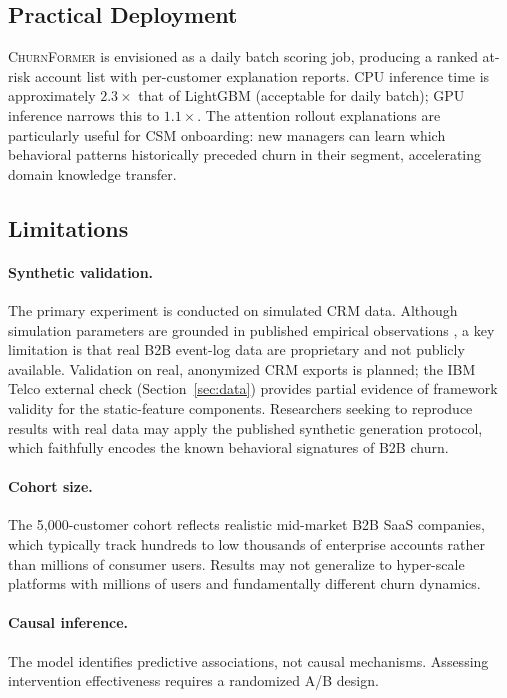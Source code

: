 \documentclass[review, 12pt]{elsarticle}
\newcommand{\model}{\textsc{ChurnFormer}}
\begin{document}
\subsection{Practical Deployment}

\model{} is envisioned as a daily batch scoring job, producing a ranked
at-risk account list with per-customer explanation reports.
CPU inference time is approximately $2.3\times$ that of LightGBM (acceptable
for daily batch); GPU inference narrows this to $1.1\times$.
The attention rollout explanations are particularly useful for CSM onboarding:
new managers can learn which behavioral patterns historically preceded churn
in their segment, accelerating domain knowledge transfer.

\subsection{Limitations}
\label{sec:limitations}

\paragraph{Synthetic validation.}
The primary experiment is conducted on simulated CRM data.
Although simulation parameters are grounded in published empirical observations
\cite{tzuo2018}, a key limitation is that real B2B event-log data are
proprietary and not publicly available.
Validation on real, anonymized CRM exports is planned; the IBM Telco external
check (Section~\ref{sec:data}) provides partial evidence of framework validity
for the static-feature components.
Researchers seeking to reproduce results with real data may apply the published
synthetic generation protocol, which faithfully encodes the known behavioral
signatures of B2B churn.

\paragraph{Cohort size.}
The 5{,}000-customer cohort reflects realistic mid-market B2B SaaS companies,
which typically track hundreds to low thousands of enterprise accounts rather
than millions of consumer users.
Results may not generalize to hyper-scale platforms with millions of users and
fundamentally different churn dynamics.

\paragraph{Causal inference.}
The model identifies predictive associations, not causal mechanisms.
Assessing intervention effectiveness requires a randomized A/B design.
\end{document}
